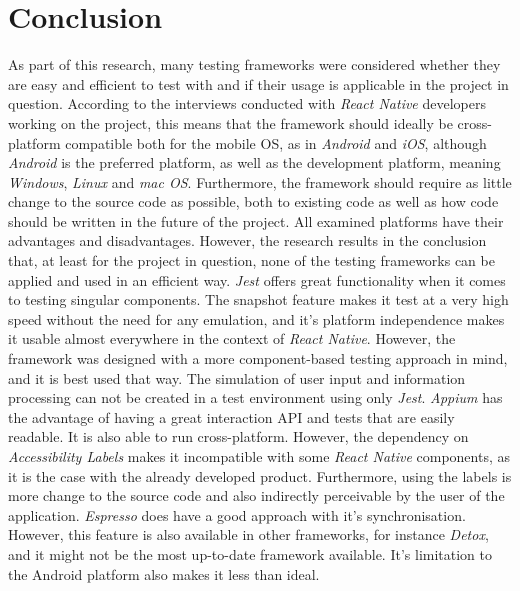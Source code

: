 \section{Conclusion}
\label{sec:Conclusion}

As part of this research, many testing frameworks were considered whether they are easy and efficient to test with and if their usage is applicable in the project in question. According to the interviews conducted with \textit{React Native} developers working on the project, this means that the framework should ideally be cross-platform compatible both for the mobile OS, as in \textit{Android} and \textit{iOS}, although \textit{Android} is the preferred platform, as well as the development platform, meaning \textit{Windows}, \textit{Linux} and \textit{mac OS}. Furthermore, the framework should require as little change to the source code as possible, both to existing code as well as how code should be written in the future of the project.
\newline
All examined platforms have their advantages and disadvantages. However, the research results in the conclusion that, at least for the project in question, none of the testing frameworks can be applied and used in an efficient way.
\newline
\textit{Jest} offers great functionality when it comes to testing singular components. The snapshot feature makes it test at a very high speed without the need for any emulation, and it's platform independence makes it usable almost everywhere in the context of \textit{React Native}. However, the framework was designed with a more component-based testing approach in mind, and it is best used that way. The simulation of user input and information processing can not be created in a test environment using only \textit{Jest}.
\newline
\textit{Appium} has the advantage of having a great interaction API and tests that are easily readable. It is also able to run cross-platform. However, the dependency on \textit{Accessibility Labels} makes it incompatible with some \textit{React Native} components, as it is the case with the already developed product. Furthermore, using the labels is more change to the source code and also indirectly perceivable by the user of the application.
\newline
\textit{Espresso} does have a good approach with it's synchronisation. However, this feature is also available in other frameworks, for instance \textit{Detox}, and it might not be the most up-to-date framework available. It's limitation to the Android platform also makes it less than ideal.
